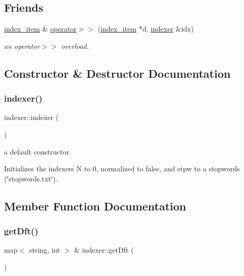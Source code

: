 \subsection*{Friends}
\begin{DoxyCompactItemize}
\item 
\hyperlink{classindex__item}{index\+\_\+item} \& \hyperlink{classindexer_af6526a689e8ed16f67708180a988b8d8}{operator$>$$>$} (\hyperlink{classindex__item}{index\+\_\+item} $\ast$d, \hyperlink{classindexer}{indexer} \&idx)
\begin{DoxyCompactList}\small\item\em an operator$>$$>$ overload. \end{DoxyCompactList}\end{DoxyCompactItemize}


\subsection{Constructor \& Destructor Documentation}
\mbox{\label{classindexer_acbbcbad080a7ae43ed78840fcf006960}} 
\subsubsection{\texorpdfstring{indexer()}{indexer()}}
{\footnotesize\ttfamily indexer\+::indexer (\begin{DoxyParamCaption}{ }\end{DoxyParamCaption})}



a default constructor. 

Initializes the indexer\textquotesingle{}s N to 0, normalized to false, and stpw to a stopwords (\char`\"{}stopwords.\+txt\char`\"{}). 

\subsection{Member Function Documentation}
\mbox{\label{classindexer_a99c8633ff92270ecbe76a5c9cf57e2e0}} 
\subsubsection{\texorpdfstring{get\+Dft()}{getDft()}}
{\footnotesize\ttfamily map$<$ string, int $>$ \& indexer\+::get\+Dft (\begin{DoxyParamCaption}{ }\end{DoxyParamCaption})}



